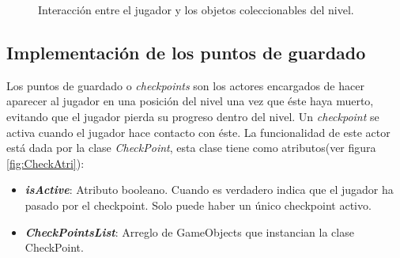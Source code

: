             \begin{figure}[h]
              \centering
       
            
              \caption{Interacción entre el jugador y los objetos coleccionables del nivel.}
              \label{fig:CollectableObjects}
        \end{figure}

\subsection{Implementación de los puntos de guardado}
Los puntos de guardado o \textit{checkpoints} son los actores encargados de
hacer aparecer al jugador en una posición del nivel una vez que éste haya muerto,
evitando que el jugador pierda su progreso dentro del nivel. Un
\textit{checkpoint} se activa cuando el jugador hace contacto con éste. La
funcionalidad de este actor está dada por la clase \textit{CheckPoint}, esta clase
tiene como atributos(ver figura \ref{fig:CheckAtri}):

\begin{itemize}
    \item \textit{\textbf{isActive}}: Atributo booleano. Cuando es verdadero indica
    que el jugador  ha pasado por el checkpoint. Solo puede haber un único checkpoint
    activo.
    \item \textit{\textbf{CheckPointsList}}: Arreglo de GameObjects que instancian
    la clase CheckPoint.
\end{itemize}

